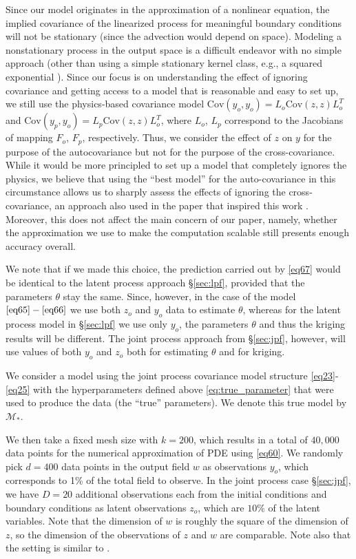 \documentclass[article,ij4uq]{ij4uq}              %
\begin{document}
Since our model originates in the approximation of a nonlinear equation, the implied covariance of the linearized process for meaningful boundary conditions will not be stationary (since the advection would depend on space). Modeling a nonstationary process in the output space is a difficult endeavor with no simple approach (other than using a simple stationary kernel class, e.g., a squared exponential \cite{GPforML}). Since our focus is on understanding the effect of ignoring covariance and getting access to a model that is reasonable and easy to set up, we still use the physics-based covariance model $\mathrm{Cov}(y_{o},y_{o})=L_{o}\mathrm{Cov}(z,z)L_{o}^{T}$ and $\mathrm{Cov}(y_{p},y_{o})=L_{p}\mathrm{Cov}(z,z)L_{o}^{T}$, where $L_{o}$, $L_{p}$ correspond to the Jacobians of mapping $F_{o}$, $F_{p}$, respectively. Thus, we consider the effect of $z$ on $y$ for the purpose of the autocovariance but not for the purpose of the cross-covariance. While it would be more principled to set up a model that completely ignores the physics, we believe that using the ``best model'' for the auto-covariance in this circumstance  allows us to sharply assess the effects of ignoring the cross-covariance, an approach also used in the paper that inspired this work \cite{CovModel}. Moreover, this does not affect the main concern of our paper, namely, whether the approximation we use to make the computation scalable still presents enough accuracy overall. 

We note that if we made this choice, the prediction carried out by \eqref{eq67} would be identical to the latent process approach \S \ref{sec:lpf}, provided that the parameters $\theta$ stay the same. Since, however, in the case of the model $\eqref{eq65}-\eqref{eq66}$ we use both $z_o$ and $y_o$ data to estimate $\theta$, whereas for the latent process model in  \S \ref{sec:lpf} we use only $y_o$, the parameters $\theta$ and thus the kriging results will be different. The joint process approach from \S \ref{sec:jpf}, however, will use values of both $y_o$ and $z_o$ both for estimating $\theta$ and for kriging. 

We consider a model using the joint process covariance model structure \eqref{eq23}-\eqref{eq25} with the hyperparameters defined above \eqref{eq:true_parameter} that were used to produce the data (the ``true'' parameters). We denote this true model by $\mathcal{M}_{*}$. 

We then take a fixed mesh size with $k=200$, which results in a total of $40,000$ data points for the numerical approximation of PDE using \eqref{eq60}. We randomly pick $d=400$ data points in the output field $w$ as observations $y_{o}$, which corresponds to 1\% of the total field to observe. In the joint process case \S \ref{sec:jpf}, we have $D=20$ additional observations each from the initial conditions and boundary conditions as latent observations $z_{o}$, which are $10\%$ of the latent variables. Note that the dimension of $w$ is roughly the square of the dimension of $z$, so the dimension of the observations of $z$ and $w$ are comparable. Note also that the setting is similar to \cite{CovModel}. 
\end{document}
